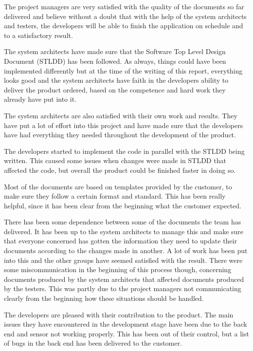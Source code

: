 \documentclass[a4paper]{article}
\begin{document}
The project managers are very satisfied with the quality of the documents so far delivered and believe without a doubt that with the help of the system architects and testers, the developers will be able to finish the application on schedule and to a satisfactory result.

The system architects have made sure that the Software Top Level Design Document (STLDD) has been followed. As always, things could have been implemented differently but at the time of the writing of this report, everything looks good and the system architects have faith in the developers ability to deliver the product ordered, based on the competence and hard work they already have put into it.  

The system architects are also satisfied with their own work and results. They have put a lot of effort into this project and have made sure that the developers have had everything they needed throughout the development of the product.

The developers started to implement the code in parallel with the STLDD being written. This caused some issues when changes were made in STLDD that affected the code, but overall the product could be finished faster in doing so. 

Most of the documents are based on templates provided by the customer, to make sure they follow a certain format and standard. This has been really helpful, since it has been clear from the beginning what the customer expected.

There has been some dependence between some of the documents the team has delivered. It has been up to the system architects to manage this and make sure that everyone concerned has gotten the information they need to update their documents according to the changes made in another. A lot of work has been put into this and the other groups have seemed satisfied with the result. There were some miscommunication in the beginning of this process though, concerning documents produced by the system architects that affected documents produced by the testers. This was partly due to the project managers not communicating clearly from the beginning how these situations should be handled. 


The developers are pleased with their contribution to the product. The main issues they have encountered in the development stage have been due to the back end and sensor not working properly. This has been out of their control, but a list of bugs in the back end has been delivered to the customer. 
\end{document}
